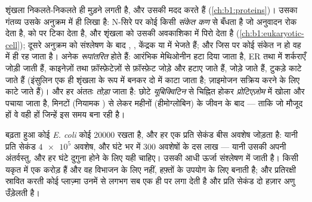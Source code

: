 \begin{proposition}[किसी नए बहुपेप्टाइड का क्या होता है]\label{prop:b1:gene-expression:after}
शृंखला निकलते-निकलते ही मुड़ने लगती है, और  उसकी मदद करते हैं
(\cref{ch:b1:proteins})। उसका गंतव्य उसके अनुक्रम में ही लिखा है:
N-सिरे पर कोई \emph{} किसी \emph{संकेत
 कण} से बँधता है जो अनुवादन रोक देता है,  को
 पर टिका देता है, और शृंखला को उसकी अवकाशिका में पिरो
देता है (\cref{ch:b1:eukaryotic-cell}); दूसरे अनुक्रम  को
संश्लेषण के बाद , , केंद्रक या  में
भेजते हैं; और जिस  पर कोई संकेत न हो वह  में ही रह जाता
है। अनेक  \emph{रूपांतरित} होते हैं: आरंभिक मेथिओनीन हटा दिया
जाता है, ER तथा  में शर्कराएँ जोड़ी जाती हैं, काइनेज़ों तथा
फ़ॉस्फ़ेटेज़ों से फ़ॉस्फ़ेट जोड़े और हटाए जाते हैं,  जोड़े जाते हैं,
टुकड़े काटे जाते हैं (इंसुलिन एक ही शृंखला के रूप में बनकर दो में काटा
जाता है; ज़ाइमोजन सक्रिय करने के लिए काटे जाते हैं)। और हर  अंततः
\emph{तोड़ा} जाता है: छोटे  \emph{यूबिक्विटिन} से चिह्नित होकर
\emph{प्रोटिएज़ोम} में खोला और पचाया जाता है, मिनटों (नियामक ) से
लेकर महीनों (हीमोग्लोबिन) के जीवन के बाद --- ताकि जो  मौजूद हों वे
वही हों जिन्हें  इस समय बना रही है।
\end{proposition}

\begin{example}[किसी कोशिका की संख्याएँ]\label{ex:b1:gene-expression:numbers}
बढ़ता हुआ कोई \emph{E. coli} कोई \num{20000}  रखता है, और हर एक
प्रति सेकंड बीस अवशेष जोड़ता है: यानी प्रति सेकंड $\num{4e5}$ अवशेष, और
घंटे भर में \qty{300}{} अवशेषों के दस लाख  --- यानी उसकी अपनी
अंतर्वस्तु, और हर घंटे दुगुना होने के लिए यही चाहिए। उसकी आधी
ऊर्जा  संश्लेषण में जाती है। किसी यकृत  में एक करोड़
 हैं और वह विभाजन के लिए नहीं, हफ़्तों के उपयोग के लिए 
बनाती है; और प्रतिरक्षी स्रावित करती कोई प्लाज़्मा  उनमें से लगभग
सब एक ही  पर लगा देती है और प्रति सेकंड दो हज़ार अणु उँड़ेलती है।
\end{example}

